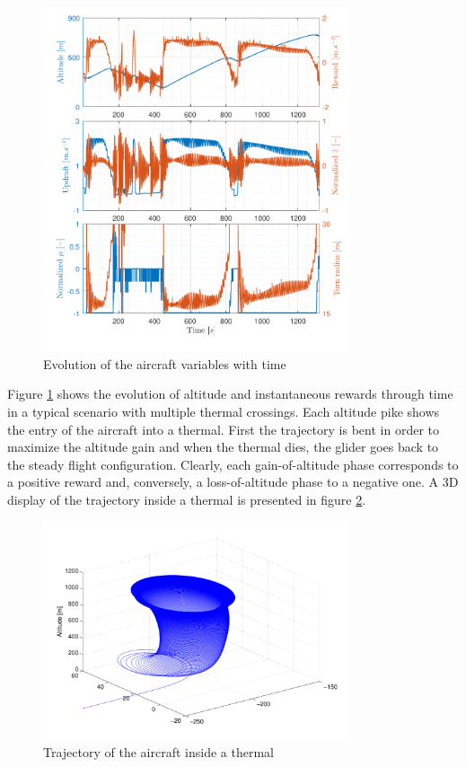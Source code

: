 \documentclass{ifacconf}
\begin{document}

\begin{figure}
\begin{center}
 \includegraphics[width=9cm]{img/traj_var.pdf}
\end{center}
\caption{Evolution of the aircraft variables with time}
\label{fig:traj_rho}
\end{figure}

Figure \ref{fig:traj_rho} shows the evolution of altitude and instantaneous rewards through time in a typical scenario with multiple thermal crossings. Each altitude pike shows the entry of the aircraft into a thermal. First the trajectory is bent in order to maximize the altitude gain and when the thermal dies, the glider goes back to the steady flight configuration. Clearly, each gain-of-altitude phase corresponds to a positive reward and, conversely, a loss-of-altitude phase to a negative one. A 3D display of the trajectory inside a thermal is presented in figure \ref{fig:traj_high_alt}.

\begin{figure}
\begin{center}
 \includegraphics[width=9cm]{img/traj_high_alt.pdf}
\end{center}
 \caption{Trajectory of the aircraft inside a thermal}
 \label{fig:traj_high_alt}
\end{figure}
\end{document}
